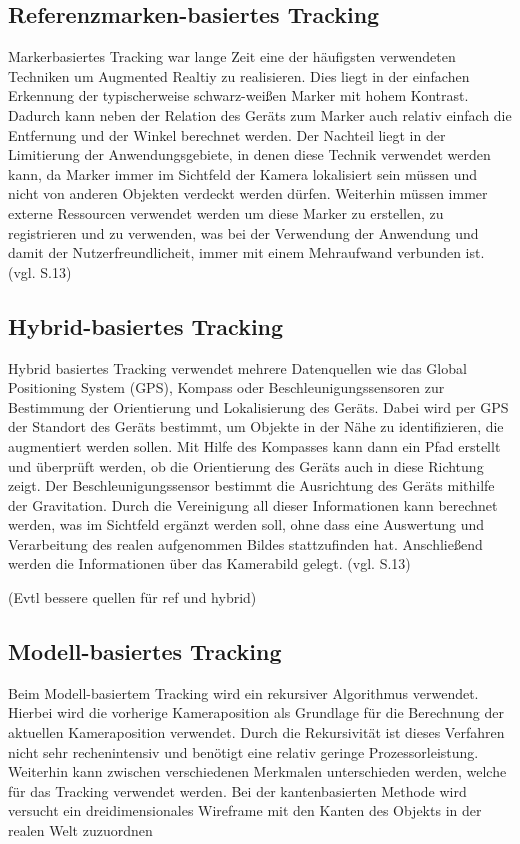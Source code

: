 \subsection{Referenzmarken-basiertes Tracking}

Markerbasiertes Tracking war lange Zeit eine der häufigsten verwendeten Techniken um Augmented Realtiy zu realisieren. Dies liegt in der einfachen Erkennung der typischerweise schwarz-weißen Marker mit hohem Kontrast. Dadurch kann neben der Relation des Geräts zum Marker auch relativ einfach die Entfernung und der Winkel berechnet werden. Der Nachteil liegt in der Limitierung der Anwendungsgebiete, in denen diese Technik verwendet werden kann, da Marker immer im Sichtfeld der Kamera lokalisiert sein müssen und nicht von anderen Objekten verdeckt werden dürfen. Weiterhin müssen immer externe Ressourcen verwendet werden um diese Marker zu erstellen, zu registrieren und zu verwenden, was bei der Verwendung der Anwendung und damit der Nutzerfreundlicheit, immer mit einem Mehraufwand verbunden ist. (vgl. \cite{comparative_sdks} S.13)

\subsection{Hybrid-basiertes Tracking}

Hybrid basiertes Tracking verwendet mehrere Datenquellen wie das Global Positioning System (GPS), Kompass oder Beschleunigungssensoren zur Bestimmung der Orientierung und Lokalisierung des Geräts. Dabei wird per GPS der Standort des Geräts bestimmt, um Objekte in der Nähe zu identifizieren, die augmentiert werden sollen. Mit Hilfe des Kompasses kann dann ein Pfad erstellt und überprüft werden, ob die Orientierung des Geräts auch in diese Richtung zeigt. Der Beschleunigungssensor bestimmt die Ausrichtung des Geräts mithilfe der Gravitation. Durch die Vereinigung all dieser Informationen kann berechnet werden, was im Sichtfeld ergänzt werden soll, ohne dass eine Auswertung und Verarbeitung des realen aufgenommen Bildes stattzufinden hat. Anschließend werden die Informationen über das Kamerabild gelegt.  (vgl. \cite{comparative_sdks} S.13)

(Evtl bessere quellen für ref und hybrid)

\subsection{Modell-basiertes Tracking}

Beim Modell-basiertem Tracking wird ein rekursiver Algorithmus verwendet. Hierbei wird die vorherige Kameraposition als Grundlage für die Berechnung der aktuellen Kameraposition verwendet. Durch die Rekursivität ist dieses Verfahren nicht sehr rechenintensiv und benötigt eine relativ geringe Prozessorleistung. Weiterhin kann zwischen verschiedenen Merkmalen unterschieden werden, welche für das Tracking verwendet werden. Bei der kantenbasierten Methode wird versucht ein dreidimensionales Wireframe mit den Kanten des Objekts in der realen Welt zuzuordnen

